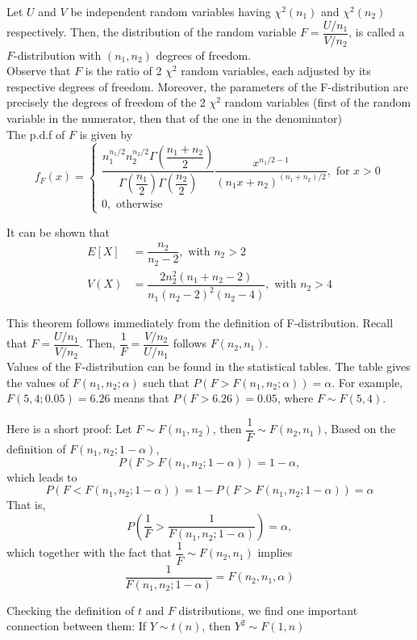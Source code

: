 \begin{definition}
Let $U$ and $V$ be independent random variables having $\chi^2(n_1)$ and $\chi^2(n_2)$ respectively. Then, the distribution of the random variable $F = \dfrac{U/n_1}{V/n_2}$, is called a $F$-distribution with $(n_1, n_2)$ degrees of freedom. \\
Observe that $F$ is the ratio of 2 $\chi^2$ random variables, each adjusted by its respective degrees of freedom. Moreover, the parameters of the F-distribution are precisely the degrees of freedom of the 2 $\chi^2$ random variables (first of the random variable in the numerator, then that of the one in the denominator) \\
The p.d.f of $F$ is given by 
$$
f_F(x) = 
\begin{cases}
\dfrac{n_1^{n_1/2}n_2^{n_2/2}\Gamma(\dfrac{n_1 + n_2}{2})}{\Gamma(\dfrac{n_1}{2})\Gamma(\dfrac{n_2}{2})} \dfrac{x^{n_1 / 2 - 1}}{(n_1 x + n_2)^{(n_1 + n_2)/2}}, \text{ for } x > 0 \\
0, \text{ otherwise}
\end{cases}
$$
\end{definition}
It can be shown that 
\begin{equation*}
    \begin{split}
        E[X] &= \dfrac{n_2}{n_2 - 2}, \text{ with } n_2 > 2 \\
        V(X) &= \dfrac{2n_2^2 (n_1 + n_2 - 2)}{n_1(n_2 - 2)^2(n_2 - 4)}, \text{ with } n_2 > 4
    \end{split}
\end{equation*}

This theorem follows immediately from the definition of F-distribution. Recall that $F = \dfrac{U/n_1}{V/n_2}$. Then, $\dfrac{1}{F} = \dfrac{V/n_2}{U/n_1}$ follows $F(n_2, n_1)$. \\
Values of the F-distribution can be found in the statistical tables. The table gives the values of $F(n_1, n_2; \alpha)$ such that $P(F > F(n_1, n_2; \alpha)) = \alpha$. For example, $F(5,4; 0.05) = 6.26$ means that $P(F > 6.26) = 0.05$, where $F \sim F(5,4)$.

Here is a short proof: Let $F \sim F(n_1, n_2)$, then $\dfrac{1}{F} \sim F(n_2, n_1)$, Based on the definition of $F(n_1, n_2; 1 - \alpha)$,
$$
P(F > F(n_1, n_2; 1 - \alpha)) = 1 - \alpha,
$$ which leads to 
$$
P(F < F(n_1, n_2; 1 - \alpha)) = 1 - P(F > F(n_1, n_2; 1 - \alpha)) = \alpha
$$
That is,
$$
P\left(\dfrac{1}{F} > \dfrac{1}{F(n_1, n_2; 1 - \alpha)} \right) = \alpha,
$$
which together with the fact that $\dfrac{1}{F} \sim F(n_2, n_1)$ implies
$$
\dfrac{1}{F(n_1, n_2; 1 - \alpha)} = F(n_2, n_1, \alpha)
$$
\begin{note}
\end{note}
Checking the definition of $t$ and $F$ distributions, we find one important connection between them: If $Y \sim t(n)$, then $Y^2 \sim F(1,n)$
